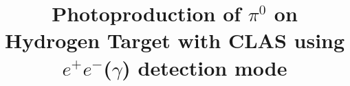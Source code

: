 \documentclass[aps,prc,onecolumn,floatfix,showpacs,preprintnumbers,amsmath,amssymb,superscriptaddress]{revtex4-1}
\def\epemT{$ e^+e^-  $}
\begin{document}
\preprint{}


\title{Photoproduction of $\pi^0$ on Hydrogen Target with CLAS using \epemT($\gamma$) detection mode}


\newcommand*{\ODU}{Old Dominion University, Norfolk, VA 23529, USA}
\newcommand*{\BOCHUM}{Institut f\"ur Kernphysik, Forschungszentrum 
	J\"ulich 52424, J\"ulich, Germany; JARA-FAME (Forces and 
	Matter Experiments), Forschungszentrum J\"ulich and RWTH 
	Aachen University, 52056 Aachen, Germany}
\newcommand*{\PNPI}{Petersburg Nuclear Physics
	Institute, Gatchina, St.\ Petersburg 188300, Russia}
\newcommand*{\KYUNGPOOK} {Kyungpook National University, 702-701, Daegu, 
	Republic of Korea}
\newcommand*{\INR}{Institute for Nuclear Research, 117312, Moscow, Russia}
\newcommand*{\GWU}{The George Washington University, Washington, DC 20052}
\newcommand*{\CUA}{Catholic University of America, Washington, DC 20064} 
\newcommand*{\JLAB}{Thomas Jefferson National Accelerator Facility, Newport 
	News, VA 23606}
\newcommand*{\UVA}{University of Virginia, Charlottesville, VA 22904, USA}
\newcommand*{\CMU}{Carnegie Mellon University, Pittsburg, PA 15213, USA}
\end{document}
